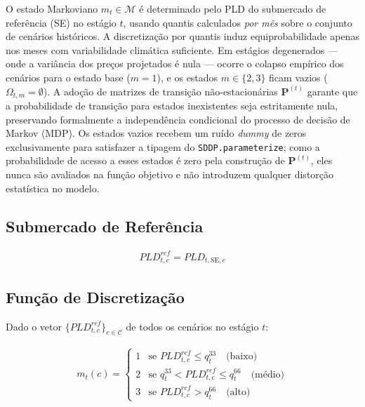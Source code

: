 \documentclass{article}
\begin{document}
O estado Markoviano $m_t \in \mathcal{M}$ é determinado pelo PLD do submercado de referência
(SE) no estágio $t$, usando quantis calculados \emph{por mês} sobre o conjunto de cenários
históricos. A discretização por quantis induz equiprobabilidade apenas nos meses com
variabilidade climática suficiente. Em estágios degenerados --- onde a variância dos preços
projetados é nula --- ocorre o colapso empírico dos cenários para o estado base
($m = 1$), e os estados $m \in \{2, 3\}$ ficam vazios ($\Omega_{t,m} = \emptyset$). A
adoção de matrizes de transição não-estacionárias $\mathbf{P}^{(t)}$ garante que a
probabilidade de transição para estados inexistentes seja estritamente nula, preservando
formalmente a independência condicional do processo de decisão de Markov (MDP). Os estados
vazios recebem um ruído \emph{dummy} de zeros exclusivamente para satisfazer a tipagem do
\texttt{SDDP.parameterize}; como a probabilidade de acesso a esses estados é zero pela
construção de $\mathbf{P}^{(t)}$, eles nunca são avaliados na função objetivo e não
introduzem qualquer distorção estatística no modelo.

\subsection{Submercado de Referência}

\begin{align}
    PLD^{ref}_{t,c} = PLD_{t,\text{SE},c}
\end{align}

\subsection{Função de Discretização}

Dado o vetor $\{PLD^{ref}_{t,c}\}_{c \in \mathcal{C}}$ de todos os cenários no estágio $t$:

\begin{align}
    m_t(c) =
    \begin{cases}
        1 & \text{se } PLD^{ref}_{t,c} \leq q^{33}_t \quad \text{(baixo)} \\
        2 & \text{se } q^{33}_t < PLD^{ref}_{t,c} \leq q^{66}_t \quad \text{(médio)} \\
        3 & \text{se } PLD^{ref}_{t,c} > q^{66}_t \quad \text{(alto)}
    \end{cases}
\end{align}
\end{document}
